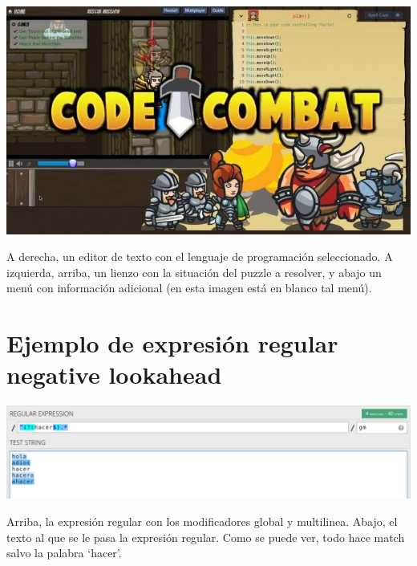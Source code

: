 \documentclass{report}
\begin{document}
	\begin{center}
	\includegraphics[width=1\linewidth]{codecombat}
	
	A derecha, un editor de texto con el lenguaje de programación seleccionado. A izquierda, arriba, un lienzo con la situación del puzzle a resolver, y abajo un menú con información adicional (en esta imagen está en blanco tal menú).
	\end{center}
	
	\chapter{Ejemplo de expresión regular negative lookahead} \label{app:c}
	
	\begin{center}
		\includegraphics[width=1\linewidth]{negativelookahead}
		
		Arriba, la expresión regular con los modificadores global y multilinea.
		Abajo, el texto al que se le pasa la expresión regular. Como se puede ver, todo hace match salvo la palabra `hacer'.
	\end{center}
	
	

	
\end{document}
